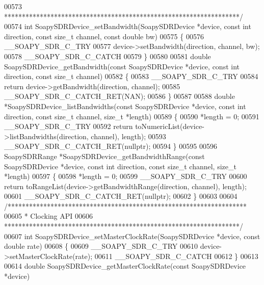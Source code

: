 \begin{DoxyCode}
00573 \textcolor{comment}{ ******************************************************************/}
00574 \textcolor{keywordtype}{int} SoapySDRDevice_setBandwidth(SoapySDRDevice *device, \textcolor{keyword}{const} \textcolor{keywordtype}{int} direction, \textcolor{keyword}{const} \textcolor{keywordtype}{size\_t} channel, \textcolor{keyword}{const} \textcolor{keywordtype}{
      double} bw)
00575 \{
00576     __SOAPY_SDR_C_TRY
00577     device->setBandwidth(direction, channel, bw);
00578     __SOAPY_SDR_C_CATCH
00579 \}
00580 
00581 \textcolor{keywordtype}{double} SoapySDRDevice_getBandwidth(\textcolor{keyword}{const} SoapySDRDevice *device, \textcolor{keyword}{const} \textcolor{keywordtype}{int} direction, \textcolor{keyword}{const} \textcolor{keywordtype}{size\_t} channel)
00582 \{
00583     __SOAPY_SDR_C_TRY
00584     \textcolor{keywordflow}{return} device->getBandwidth(direction, channel);
00585     __SOAPY_SDR_C_CATCH_RET(NAN);
00586 \}
00587 
00588 \textcolor{keywordtype}{double} *SoapySDRDevice_listBandwidths(\textcolor{keyword}{const} SoapySDRDevice *device, \textcolor{keyword}{const} \textcolor{keywordtype}{int} direction, \textcolor{keyword}{const} \textcolor{keywordtype}{size\_t} 
      channel, \textcolor{keywordtype}{size\_t} *length)
00589 \{
00590     *length = 0;
00591     __SOAPY_SDR_C_TRY
00592     \textcolor{keywordflow}{return} toNumericList(device->listBandwidths(direction, channel), length);
00593     __SOAPY_SDR_C_CATCH_RET(\textcolor{keyword}{nullptr});
00594 \}
00595 
00596 SoapySDRRange *SoapySDRDevice_getBandwidthRange(\textcolor{keyword}{const} SoapySDRDevice *device, \textcolor{keyword}{const} \textcolor{keywordtype}{int} direction, \textcolor{keyword}{const} \textcolor{keywordtype}{
      size\_t} channel, \textcolor{keywordtype}{size\_t} *length)
00597 \{
00598     *length = 0;
00599     __SOAPY_SDR_C_TRY
00600     \textcolor{keywordflow}{return} toRangeList(device->getBandwidthRange(direction, channel), length);
00601     __SOAPY_SDR_C_CATCH_RET(\textcolor{keyword}{nullptr});
00602 \}
00603 
00604 \textcolor{comment}{/*******************************************************************}
00605 \textcolor{comment}{ * Clocking API}
00606 \textcolor{comment}{ ******************************************************************/}
00607 \textcolor{keywordtype}{int} SoapySDRDevice_setMasterClockRate(SoapySDRDevice *device, \textcolor{keyword}{const} \textcolor{keywordtype}{double} rate)
00608 \{
00609     __SOAPY_SDR_C_TRY
00610     device->setMasterClockRate(rate);
00611     __SOAPY_SDR_C_CATCH
00612 \}
00613 
00614 \textcolor{keywordtype}{double} SoapySDRDevice_getMasterClockRate(\textcolor{keyword}{const} SoapySDRDevice *device)

\end{DoxyCode}
